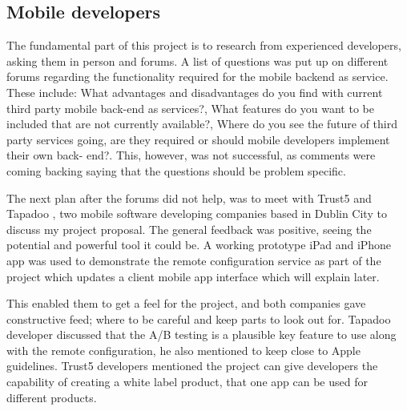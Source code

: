 


\subsection{Mobile developers}

The fundamental part of this project is to research from experienced developers, asking them in person and forums. A list of questions was put up on different forums regarding the functionality required for the mobile backend as service. These include: What advantages and disadvantages do you find with current third party mobile back-end as services?, What features do you want to be included that are not currently available?, Where do you see the future of third party services going, are they required or should mobile developers implement their own back- end?. This, however, was not successful, as comments were coming backing saying that the questions should be problem specific.

The next plan after the forums did not help, was to meet with Trust5  \cite{trust5} and Tapadoo \cite{tapadoo}, two mobile software developing companies based in Dublin City to discuss my project proposal. The general feedback was positive, seeing the potential and powerful tool it could be. A working prototype iPad and iPhone app was used to demonstrate the remote configuration service as part of the project which updates a client mobile app interface which will explain later. 

This enabled them to get a feel for the project, and both companies gave constructive feed; where to be careful and keep parts to look out for. Tapadoo developer discussed that the A/B testing is a plausible key feature to use along with the remote configuration, he also mentioned to keep close to Apple guidelines. Trust5 developers mentioned the project can give developers the capability of creating a white label product, that one app can be used for different products.

